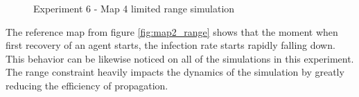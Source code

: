 \begin{figure}[H]
    \centering

    \hspace*{\fill}
    \hspace*{\fill}

    \caption{Experiment 6 - Map 4 limited range simulation}\label{fig:map4_range}
\end{figure}

\pagebreak
The reference map from figure \ref{fig:map2_range} shows that the moment when first recovery of an agent starts, the infection rate starts rapidly falling down.
This behavior can be likewise noticed on all of the simulations in this experiment.
The range constraint heavily impacts the dynamics of the simulation by greatly reducing the efficiency of propagation.

